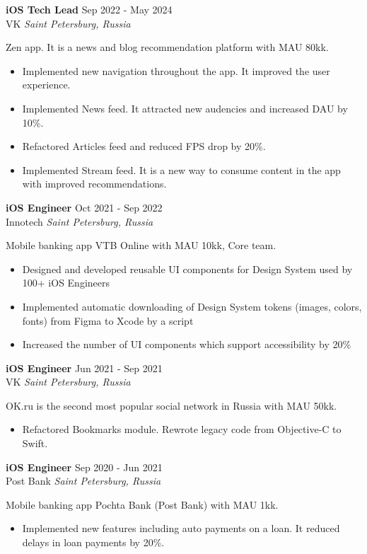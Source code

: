 \documentclass[a4paper,10pt]{article}
\begin{document}
\textbf{iOS Tech Lead} \hfill Sep 2022 - May 2024 \\
VK \hfill \textit{Saint Petersburg, Russia}

Zen app. It is a news and blog recommendation platform with MAU 80kk.
 \begin{itemize}
    \itemsep -5pt {} 
     \item Implemented new navigation throughout the app. It improved the user experience.
     \item Implemented News feed. It attracted new audencies and increased DAU by 10\%.
     \item Refactored Articles feed and reduced FPS drop by 20\%.
     \item Implemented Stream feed. It is a new way to consume content in the app with improved recommendations.
 \end{itemize}

\textbf{iOS Engineer} \hfill Oct 2021 - Sep 2022\\
Innotech \hfill \textit{Saint Petersburg, Russia}

Mobile banking app VTB Online with MAU 10kk, Core team.
 \begin{itemize}
    \itemsep -5pt {} 
     \item Designed and developed reusable UI components for Design System used by 100+ iOS Engineers
     \item Implemented automatic downloading of Design System tokens (images, colors, fonts) from Figma to Xcode by a script
     \item Increased the number of UI components which support accessibility by 20\%
 \end{itemize}

\textbf{iOS Engineer} \hfill Jun 2021 - Sep 2021\\
VK \hfill \textit{Saint Petersburg, Russia}

OK.ru is the second most popular social network in Russia with MAU 50kk.
 \begin{itemize}
    \itemsep -5pt {} 
     \item Refactored Bookmarks module. Rewrote legacy code from Objective-C to Swift.
 \end{itemize}

\textbf{iOS Engineer} \hfill Sep 2020 - Jun 2021\\
Post Bank \hfill \textit{Saint Petersburg, Russia}

Mobile banking app Pochta Bank (Post Bank) with MAU 1kk.
 \begin{itemize}
    \itemsep -5pt {} 
     \item Implemented new features including auto payments on a loan. It reduced delays in loan payments by 20\%.
 \end{itemize}
\end{document}
